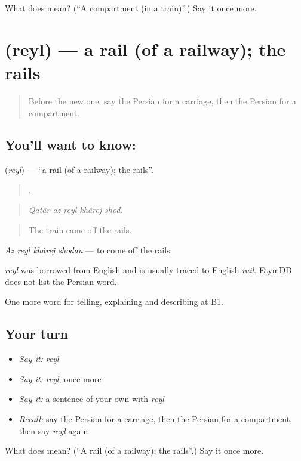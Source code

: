 \begin{tcolorbox}[breakable,colback=teal!4,colframe=teal!35!black,title={Before you move on}]
What does  mean? (\textquotedblleft{}A compartment (in a train)\textquotedblright{}.) Say it once more.
\end{tcolorbox}
\section[\texorpdfstring{\fa{ریل} (reyl)}{ریل (reyl)}]{ (reyl) — a rail (of a railway); the rails}

\label{lesson:FA-C429-reyl}



\begin{quote}
Before the new one: say the Persian for a carriage, then the Persian for a compartment.
\end{quote}

\subsection*{You'll want to know: }
\textbf{} (\emph{reyl}) — \textquotedblleft{}a rail (of a railway); the rails\textquotedblright{}.

\begin{quote}
    .
\end{quote}

\begin{quote}
\emph{Qatâr az reyl khârej shod.}
\end{quote}

\begin{quote}
The train came off the rails.
\end{quote}

\emph{Az reyl khârej shodan} — to come off the rails.

\begin{cousinweb}
\emph{reyl} was borrowed from English and is usually traced to English \emph{rail}. EtymDB does not list the Persian word.
\end{cousinweb}

\begin{grammarlens}[title={What you've built}]
One more word for telling, explaining and describing at B1.
\end{grammarlens}

\subsection*{Your turn}
\begin{itemize}
\raggedright
  \item \emph{Say it:} \emph{reyl}
  \item \emph{Say it:} \emph{reyl}, once more
  \item \emph{Say it:} a sentence of your own with \emph{reyl}
  \item \emph{Recall:} say the Persian for a carriage, then the Persian for a compartment, then say \emph{reyl} again
\end{itemize}

\begin{tcolorbox}[breakable,colback=teal!4,colframe=teal!35!black,title={Before you move on}]
What does  mean? (\textquotedblleft{}A rail (of a railway); the rails\textquotedblright{}.) Say it once more.
\end{tcolorbox}
